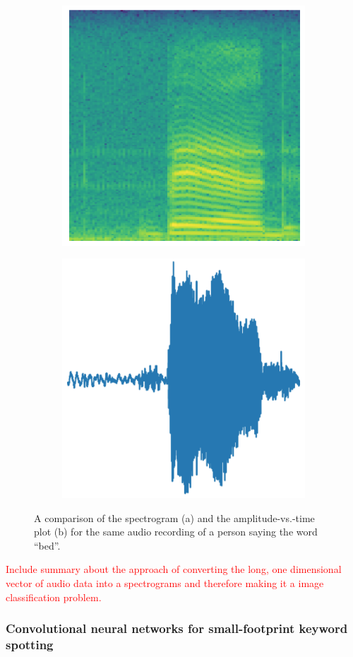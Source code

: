 \documentclass{article}
\theoremstyle{definition}
\theoremstyle{remark}
\begin{document}
\begin{figure}
\centering
\begin{subfigure}{.5\textwidth}
  \centering
  \includegraphics[width=.5\linewidth]{img/papers/image_recognition/spectrogram.png}
  \caption{}
  \label{fig:sub1}
\end{subfigure}%
\begin{subfigure}{.5\textwidth}
  \centering
  \includegraphics[width=.5\linewidth]{img/papers/image_recognition/amplitude_vs_time.png}
  \caption{}
  \label{fig:sub2}
\end{subfigure}
\caption{A comparison of the spectrogram (a) and the
amplitude-vs.-time plot (b) for the same audio recording of
a person saying the word “bed”.}
\label{fig:spectrogram_vs_time_plot}
\end{figure}



\textcolor{red}{Include summary about the approach of converting the long, one dimensional vector of audio data into a spectrograms and therefore making it a image classification problem.}

\subsubsection{Convolutional neural networks for small-footprint keyword spotting}
\end{document}
